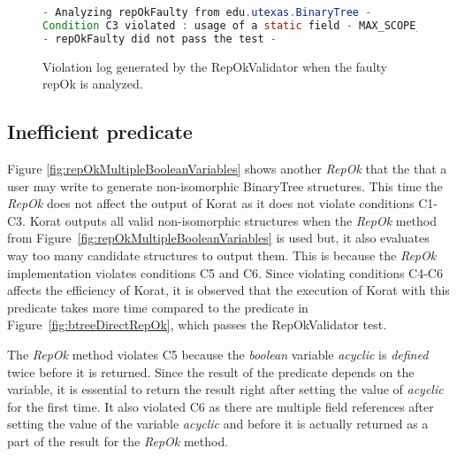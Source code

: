 \begin{figure}
\centering
\begin{lstlisting}[language=Java]
- Analyzing repOkFaulty from edu.utexas.BinaryTree -
Condition C3 violated : usage of a static field - MAX_SCOPE_PARAM from class edu.utexas.BinaryTree$Settings at line 54 inside repOKEfficient in edu.utexas.BinaryTree
- repOkFaulty did not pass the test -
\end{lstlisting}
\caption{Violation log generated by the RepOkValidator when the faulty repOk is analyzed.}
\label{fig:repOkKoratSatisfyCorrectnessLog}
\end{figure}

\subsection{Inefficient predicate}
\label{sec:inefficient-predicate}
Figure \ref{fig:repOkMultipleBooleanVariables} shows another
\emph{RepOk} that the that a user may write to generate non-isomorphic
BinaryTree structures. This time the \emph{RepOk} does not affect the
output of Korat as it does not violate conditions C1-C3. Korat outputs
all valid non-isomorphic structures when the \emph{RepOk} method from
Figure~\ref{fig:repOkMultipleBooleanVariables} is used but, it also
evaluates way too many candidate structures to output them. This is
because the \emph{RepOk} implementation violates conditions C5 and
C6. Since violating conditions C4-C6 affects the efficiency of Korat,
it is observed that the execution of Korat with this predicate takes
more time compared to the predicate in Figure~\ref{fig:btreeDirectRepOk}, which passes the RepOkValidator test.

\para The \emph{RepOk} method violates C5 because the \emph{boolean}
variable \emph{acyclic} is \emph{defined} twice before it is
returned. Since the result of the predicate depends on the variable,
it is essential to return the result right after setting the value of
\emph{acyclic} for the first time. It also violated C6 as there are
multiple field references after setting the value of the variable
\emph{acyclic} and before it is actually returned as a part of the
result for the \emph{RepOk} method.

